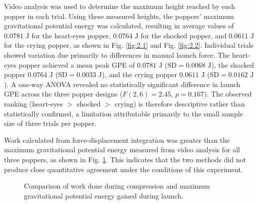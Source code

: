 \documentclass[12pt]{article}
\begin{document}
Video analysis was used to determine the maximum height reached by each popper in each trial. Using these measured heights, the poppers' maximum gravitational potential energy was calculated, resulting in average values of $0.0781\text{ J}$ for the heart-eyes popper, $0.0764\text{ J}$ for the shocked popper, and $0.0611\text{ J}$ for the crying popper, as shown in Fig. \ref{fig:2.1} and Fig. \ref{fig:2.2}. Individual trials showed variation due primarily to differences in manual launch force. The heart-eyes popper achieved a mean peak GPE of $0.0781\text{ J}$ ($\text{SD} = 0.0068\text{ J}$), the shocked popper $0.0764\text{ J}$ ($\text{SD} = 0.0033\text{ J}$), and the crying popper $0.0611\text{ J}$ ($\text{SD} = 0.0162\text{ J}$). A one-way ANOVA revealed no statistically significant difference in launch GPE across the three popper designs ($F(2, 6) = 2.45$, $p = 0.167$). The observed ranking (heart-eyes $>$ shocked $>$ crying) is therefore descriptive rather than statistically confirmed, a limitation attributable primarily to the small sample size of three trials per popper.

Work calculated from force-displacement integration was greater than the maximum gravitational potential energy measured from video analysis for all three poppers, as shown in Fig. \ref{fig:3}. This indicates that the two methods did not produce close quantitative agreement under the conditions of this experiment.

\begin{figure}[H]
    \centering
    
    \caption{Comparison of work done during compression and maximum gravitational potential energy gained during launch.}
    \label{fig:3}
\end{figure}
\end{document}
